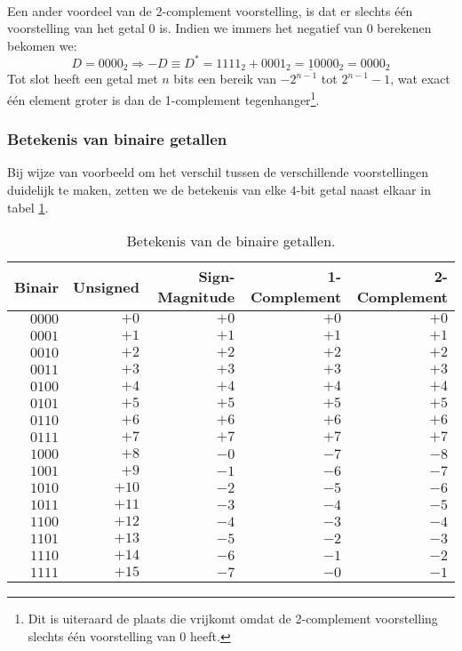 \paragraph{}
Een ander voordeel van de 2-complement voorstelling, is dat er slechts \'e\'en voorstelling van het getal 0 is. Indien we immers het negatief van 0 berekenen bekomen we:
\begin{equation}
D=0000_2\Rightarrow -D\equiv D^*=1111_2+0001_2=\underline{1}0000_2=0000_2
\end{equation}
Tot slot heeft een getal met $n$ bits een bereik van $-2^{n-1}$ tot $2^{n-1}-1$, wat exact \'e\'en element groter is dan de 1-complement tegenhanger\footnote{Dit is uiteraard de plaats die vrijkomt omdat de 2-complement voorstelling slechts \'e\'en voorstelling van 0 heeft.}.
\subsubsection{Betekenis van binaire getallen}
Bij wijze van voorbeeld om het verschil tussen de verschillende voorstellingen duidelijk te maken, zetten we de betekenis van elke $4$-bit getal naast elkaar in tabel \ref{tbl:binaryMeaningSigned}.
\begin{table}[hbt]
\centering
\begin{tabular}{r|rrrr}
Binair&Unsigned&Sign-Magnitude&1-Complement&2-Complement\\\hline
$0000$&$+0$&$+0$&$+0$&$+0$\\
$0001$&$+1$&$+1$&$+1$&$+1$\\
$0010$&$+2$&$+2$&$+2$&$+2$\\
$0011$&$+3$&$+3$&$+3$&$+3$\\
$0100$&$+4$&$+4$&$+4$&$+4$\\
$0101$&$+5$&$+5$&$+5$&$+5$\\
$0110$&$+6$&$+6$&$+6$&$+6$\\
$0111$&$+7$&$+7$&$+7$&$+7$\\
$1000$&$+8$&$-0$&$-7$&$-8$\\
$1001$&$+9$&$-1$&$-6$&$-7$\\
$1010$&$+10$&$-2$&$-5$&$-6$\\
$1011$&$+11$&$-3$&$-4$&$-5$\\
$1100$&$+12$&$-4$&$-3$&$-4$\\
$1101$&$+13$&$-5$&$-2$&$-3$\\
$1110$&$+14$&$-6$&$-1$&$-2$\\
$1111$&$+15$&$-7$&$-0$&$-1$
\end{tabular}
\caption{Betekenis van de binaire getallen.}
\label{tbl:binaryMeaningSigned}
\end{table}
